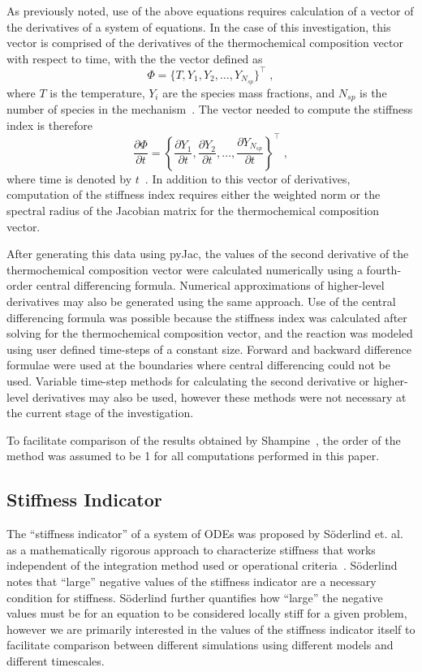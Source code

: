 \documentclass[12pt]{ussci}
\begin{document}
As previously noted, use of the above equations requires calculation of a vector of the derivatives of a system of equations.
In the case of this investigation, this vector is comprised of the derivatives of the thermochemical composition vector with respect to time, with the the vector defined as
\begin{equation}
    \Phi = \{T, Y_1, Y_2, \dots, Y_{N_{sp}} \}^\intercal \;,
\end{equation}
where $T$ is the temperature, $Y_i$ are the species mass fractions, and $N_{sp}$ is the number of species in the mechanism~\cite{Niemeyer:2017}.
The vector needed to compute the stiffness index is therefore
\begin{equation}
    \frac{\partial \Phi}{\partial t} = \left\{\frac{\partial Y_1}{\partial t}, \frac{\partial Y_2}{\partial t}, \dots, \frac{\partial Y_{N_{sp}}}{\partial t} \right\}^\intercal \;,
\end{equation}
where time is denoted by $t$~\cite{Niemeyer:2017}.
In addition to this vector of derivatives, computation of the stiffness index requires either the weighted norm or the spectral radius of the Jacobian matrix for the thermochemical composition vector.

After generating this data using pyJac, the values of the second derivative of the thermochemical composition vector were calculated numerically using a fourth-order central differencing formula.
Numerical approximations of higher-level derivatives may also be generated using the same approach.
Use of the central differencing formula was possible because the stiffness index was calculated after solving for the thermochemical composition vector, and the reaction was modeled using user defined time-steps of a constant size.
Forward and backward difference formulae were used at the boundaries where central differencing could not be used.
Variable time-step methods for calculating the second derivative or higher-level derivatives may also be used, however these methods were not necessary at the current stage of the investigation.

To facilitate comparison of the results obtained by Shampine~\cite{Shampine1985}, the order of the method was assumed to be 1 for all computations performed in this paper.

\subsection{Stiffness Indicator}
The ``stiffness indicator'' of a system of ODEs was proposed by S{\"o}derlind et. al. as a mathematically rigorous approach to characterize stiffness that works independent of the integration method used or operational criteria~\cite{Soderlind2014}.
S{\"o}derlind notes that ``large'' negative values of the stiffness indicator are a necessary condition for stiffness.
S{\"o}derlind further quantifies how ``large'' the negative values must be for an equation to be considered locally stiff for a given problem, however we are primarily interested in the values of the stiffness indicator itself to facilitate comparison between different simulations using different models and different timescales.
\end{document}
